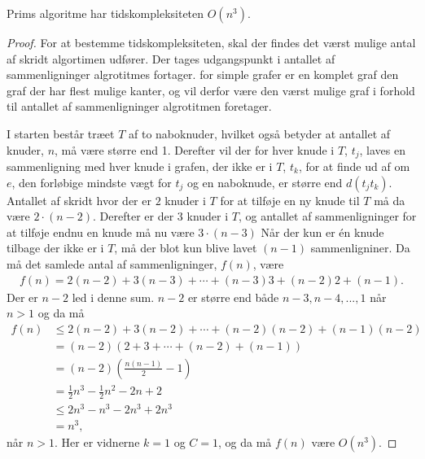 \begin{thm}
	Prims algoritme har tidskompleksiteten $O (n^3)$.
\end{thm}
\begin{proof}
	For at bestemme tidskompleksiteten, skal der findes det værst mulige antal af skridt algortimen udfører.
	Der tages udgangspunkt i antallet af sammenligninger algrotitmes fortager.
	for simple grafer er en komplet graf den graf der har flest mulige kanter, og vil derfor være den værst mulige graf i forhold til antallet af sammenligninger algrotitmen foretager.

	I starten består træet $T$ af to naboknuder, hvilket også betyder at antallet af knuder, $n$, må være større end 1.
	Derefter vil der for hver knude i $T$, $t_j$, laves en sammenligning med hver knude i grafen, der ikke er i $T$, $t_k$, for at finde ud af om $e$, den forløbige mindste vægt for $t_j$ og en naboknude, er større end $d(t_j t_k)$.
	Antallet af skridt hvor der er $2$ knuder i $T$ for at tilføje en ny knude til $T$ må da være $2 \cdot (n - 2)$.
	Derefter er der $3$ knuder i $T$, og antallet af sammenligninger for at tilføje endnu en knude må nu være $3 \cdot (n - 3)$
	Når der kun er én knude tilbage der ikke er i $T$, må der blot kun blive lavet $(n-1)$ sammenligniner.
	Da må det samlede antal af sammenligninger, $f(n)$, være
	\begin{align*}
		f(n) = 2 (n-2) + 3(n-3) + \dotsb + (n-3) 3 + (n-2) 2 + (n -1).
	\end{align*}
	Der er $n -2$ led i denne sum. $n-2$ er større end både $n-3, n-4, ..., 1$ når $n > 1$ og da må
	\begin{align*}
		f(n)
		&\leq 2 (n-2) + 3 (n-2) + \dotsb + (n-2) (n-2) + (n-1) (n-2) \\
		&= (n-2) \left( 2 + 3 + \dotsb + (n-2) + (n-1) \right) \\
		&= (n-2) \left( \frac{n(n-1)}{2} - 1 \right) \\
		&= \frac{1}{2} n^3 - \frac{1}{2} n^2 - 2n + 2 \\
		&\leq 2n^3 - n^3 - 2n^3 + 2n^3 \\
		&= n^3,
	\end{align*}
	når $n > 1$. Her er vidnerne $k=1$ og $C=1$, og da må $f(n)$ være $O(n^3)$.
\end{proof}
